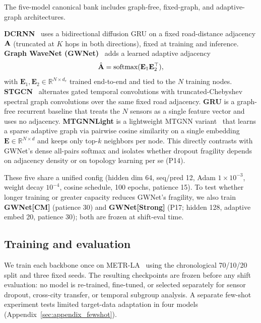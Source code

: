 The five-model canonical bank includes graph-free, fixed-graph, and adaptive-graph architectures.

\textbf{DCRNN}~\citep{li2018dcrnn} uses a bidirectional diffusion GRU on a
fixed road-distance adjacency $\mathbf{A}$ (truncated at $K$ hops in both
directions), fixed at training and inference.
\textbf{Graph WaveNet (GWNet)}~\citep{wu2019gwnet} adds a learned adaptive
adjacency
\begin{equation}
  \hat{\mathbf{A}} = \text{softmax}(\mathbf{E}_1 \mathbf{E}_2^\top),
  \label{eq:adaptive_adj}
\end{equation}
with $\mathbf{E}_1, \mathbf{E}_2 \in \mathbb{R}^{N \times d_e}$ trained end-to-end and tied to the $N$ training nodes.
\textbf{STGCN}~\citep{yu2018stgcn} alternates gated temporal convolutions with
truncated-Chebyshev spectral graph convolutions over the same fixed road
adjacency.
\textbf{GRU} is a graph-free recurrent baseline that treats the $N$ sensors as
a single feature vector and uses no adjacency.
\textbf{MTGNNLight} is a lightweight MTGNN variant~\citep{wu2020mtgnn} that
learns a sparse adaptive graph via pairwise cosine similarity on a single
embedding $\mathbf{E}\in\mathbb{R}^{N\times d}$ and keeps only top-$k$
neighbors per node. This directly contrasts with GWNet's dense all-pairs
softmax and isolates whether dropout fragility depends on adjacency density or
on topology learning per se (P14).

These five share a unified config (hidden dim 64, seq/pred 12, Adam $1{\times}10^{-3}$,
weight decay $10^{-4}$, cosine schedule, 100 epochs, patience 15). To test whether longer training or greater capacity reduces GWNet's fragility, we also train
\textbf{GWNet[CM]} (patience 30) and \textbf{GWNet[Strong]} (P17; hidden 128,
adaptive embed 20, patience 30); both are frozen at shift-eval time.

\subsection{Training and evaluation}
\label{subsec:bank}

We train each backbone once on METR-LA~\citep{li2018dcrnn} using the
chronological 70/10/20 split and three fixed seeds. The resulting checkpoints
are frozen before any shift evaluation: no model is re-trained, fine-tuned, or
selected separately for sensor dropout, cross-city transfer, or temporal
subgroup analysis.
A separate few-shot experiment tests limited target-data adaptation in four models (Appendix~\ref{sec:appendix_fewshot}).


